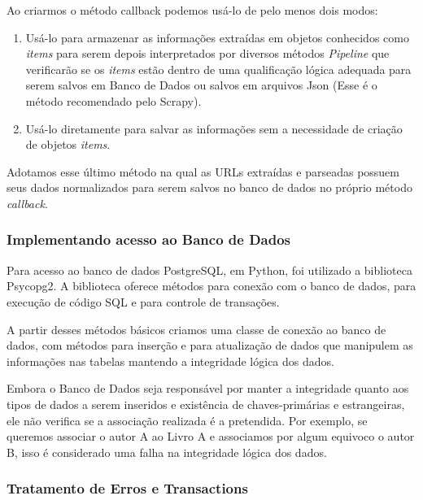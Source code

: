 \documentclass[12pt]{article}
\begin{document}
Ao criarmos o método callback podemos usá-lo de pelo menos dois modos: 

\begin{enumerate}
\item Usá-lo para armazenar as informações extraídas em objetos conhecidos como \textit{items} para serem depois interpretados por diversos métodos \textit{Pipeline} que verificarão se os \textit{items} estão dentro de uma qualificação lógica adequada para serem salvos em Banco de Dados ou salvos em arquivos Json (Esse é o método recomendado pelo Scrapy).
\item Usá-lo diretamente para salvar as informações sem a necessidade de criação de objetos \textit{items}.
\end{enumerate}

Adotamos esse último método na qual as URLs extraídas e parseadas possuem seus dados normalizados para serem salvos no banco de dados no próprio método \textit{callback}.
  
 
 
 
\subsubsection{Implementando acesso ao Banco de Dados}

Para acesso ao banco de dados PostgreSQL, em Python, foi utilizado a biblioteca Psycopg2. A biblioteca oferece métodos para conexão com o banco de dados, para execução de código SQL e para controle de transações.

A partir desses métodos básicos criamos uma classe de conexão ao banco de dados, com métodos para inserção e para atualização de dados que manipulem as informações nas tabelas mantendo a integridade lógica dos dados. 

Embora o Banco de Dados seja responsável por manter a integridade quanto aos tipos de dados a serem inseridos e existência de chaves-primárias e estrangeiras, ele não verifica se a associação realizada é a pretendida. Por exemplo, se queremos associar o autor A ao Livro A e associamos por algum equivoco o autor B, isso é considerado uma falha na integridade lógica dos dados. 

\subsubsection{Tratamento de Erros e Transactions}
\end{document}
